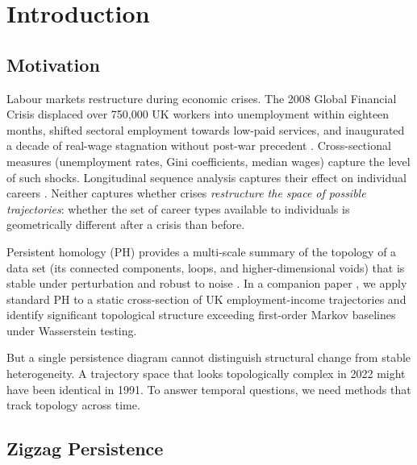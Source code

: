 
\section{Introduction}

\subsection{Motivation}

Labour markets restructure during economic crises.
The 2008 Global Financial Crisis displaced over 750,000 UK workers into
unemployment within eighteen months, shifted sectoral employment towards
low-paid services, and inaugurated a decade of real-wage stagnation without
post-war precedent \citep{gregg2010unemployment, blundell2014wages}.
Cross-sectional measures (unemployment rates, Gini coefficients, median wages)
capture the level of such shocks.
Longitudinal sequence analysis captures their effect on individual careers
\citep{abbott1995sequence, halpin1998class}.
Neither captures whether crises \emph{restructure the space of possible
trajectories}: whether the set of career types available to individuals is
geometrically different after a crisis than before.

Persistent homology (PH) provides a multi-scale summary of the topology of a
data set (its connected components, loops, and higher-dimensional voids) that is
stable under perturbation and robust to noise
\citep{edelsbrunner2010computational, carlsson2009topology}.
In a companion paper \citep{dorman2026a}, we apply standard PH to a static
cross-section of UK employment-income trajectories and identify significant
topological structure exceeding first-order Markov baselines under Wasserstein
testing.

But a single persistence diagram cannot distinguish structural change from stable
heterogeneity.
A trajectory space that looks topologically complex in 2022 might have been
identical in 1991.
To answer temporal questions, we need methods that track topology across time.

\subsection{Zigzag Persistence}

